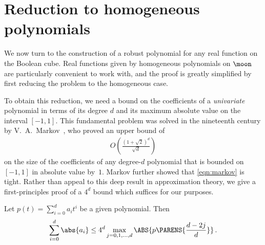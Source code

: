 \section{Reduction to homogeneous polynomials}
\label{sec:homogeneous}

We now turn to the construction of a robust polynomial
for any real function on the Boolean cube. Real
functions given by homogeneous polynomials on $\moon$ are
particularly convenient to work with, and the proof is
greatly simplified by first reducing the problem to the
homogeneous case. 

To obtain this reduction, we need a bound on the
coefficients of a \emph{univariate} polynomial in terms
of its degree $d$ and its maximum absolute value on
the interval $[-1,1]$. This fundamental problem was
solved in the nineteenth century by
V.~A.~Markov~\cite[p.~81]{markov-v-a1982least-dev}, who
proved an upper bound of 
\begin{align}
O\left(\frac{(1+\sqrt 2)^d}{\sqrt d}\right)
\label{eqn:markov}
\end{align}
on the size of the coefficients of any degree-$d$
polynomial that is bounded on $[-1,1]$ in absolute value by~$1$. 
Markov further showed that \eqref{eqn:markov} is
tight. Rather than appeal to this deep result in
approximation theory, we give a first-principles proof
of a $4^d$ bound which suffices for our purposes.


\begin{lemma}
\label{lem:bound-poly-coeffs}
Let $p(t)=\sum_{i=0}^d a_it^i$ be a given polynomial. Then
\begin{align}
\label{eqn:bound-poly-coeffs}
\sum_{i=0}^d \abs{a_i} \leq 4^d 
\max_{j=0,1,\dots,d}\ABS{p\PARENS{\frac {d-2j}d}}\,.
\end{align}
\end{lemma}

